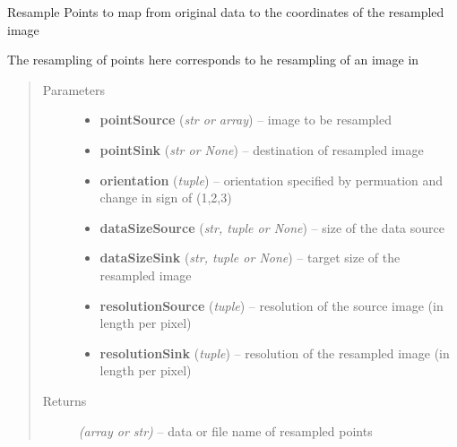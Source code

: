 \documentclass[letterpaper,10pt,english]{sphinxmanual}
\begin{document}
\begin{fulllineitems}
\label{api/ClearMap.Alignment:ClearMap.Alignment.Resampling.resamplePoints}
Resample Points to map from original data to the coordinates of the resampled image

The resampling of points here corresponds to he resampling of an image in {\hyperref[api/ClearMap.Alignment:ClearMap.Alignment.Resampling.resampleData]{\emph{}}}
\begin{quote}\begin{description}
\item[{Parameters}] \leavevmode\begin{itemize}
\item {} 
\textbf{pointSource} (\emph{str or array}) --
image to be resampled

\item {} 
\textbf{pointSink} (\emph{str or None}) --
destination of resampled image

\item {} 
\textbf{orientation} (\emph{tuple}) --
orientation specified by permuation and change in sign of (1,2,3)

\item {} 
\textbf{dataSizeSource} (\emph{str, tuple or None}) --
size of the data source

\item {} 
\textbf{dataSizeSink} (\emph{str, tuple or None}) --
target size of the resampled image

\item {} 
\textbf{resolutionSource} (\emph{tuple}) --
resolution of the source image (in length per pixel)

\item {} 
\textbf{resolutionSink} (\emph{tuple}) --
resolution of the resampled image (in length per pixel)

\end{itemize}

\item[{Returns}] \leavevmode
\emph{(array or str)} --
data or file name of resampled points

\end{description}\end{quote}

\end{fulllineitems}
\end{document}
